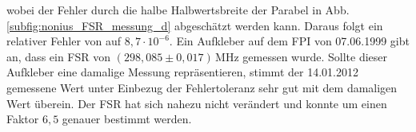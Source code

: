wobei der Fehler durch die halbe Halbwertsbreite der Parabel in Abb.
\ref{subfig:nonius_FSR_messung_d} abgeschätzt werden kann. Daraus folgt ein
relativer Fehler von auf $8,7\cdot10^{-6}$. Ein Aufkleber auf dem FPI von
07.06.1999 gibt an, dass ein FSR von $(298,085\pm0,017)\,$MHz gemessen wurde.
Sollte dieser Aufkleber eine damalige Messung repräsentieren, stimmt der
14.01.2012 gemessene Wert unter Einbezug der Fehlertoleranz sehr gut mit dem
damaligen Wert überein. Der FSR hat sich nahezu nicht verändert und konnte um
einen Faktor $6,5$ genauer bestimmt werden.
\begin{figure}[H]
 	\centering
\end{figure}
